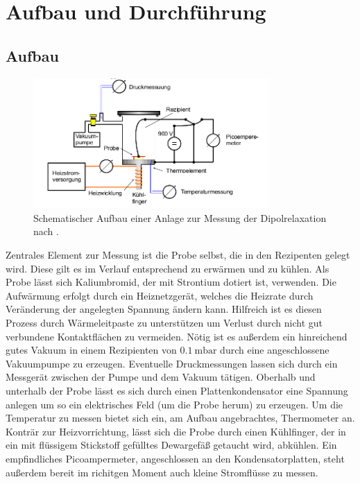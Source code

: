 \section{Aufbau und Durchführung}
\subsection{Aufbau}
\begin{figure}
    \centering
    \includegraphics[width=0.8\textwidth]{bilder/Aufbau.png}
    \caption{Schematischer Aufbau einer Anlage zur Messung der Dipolrelaxation nach
            \cite{skript}.}
    \label{fig:aufbau}
\end{figure}

Zentrales Element zur Messung ist die Probe selbst, die in den Rezipenten gelegt wird. Diese gilt es im Verlauf entsprechend
zu erwärmen und zu kühlen. Als Probe lässt sich Kaliumbromid, der mit Strontium
dotiert ist, verwenden. Die Aufwärmung erfolgt durch ein Heiznetzgerät, welches die Heizrate durch Veränderung der angelegten Spannung ändern kann.
Hilfreich ist es diesen Prozess durch Wärmeleitpaste zu unterstützen um
Verlust durch nicht gut verbundene Kontaktflächen zu vermeiden.
Nötig ist es außerdem ein hinreichend gutes Vakuum in einem Rezipienten von $\SI{0.1}{\milli\bar}$ 
durch eine angeschlossene Vakuumpumpe zu erzeugen.
Eventuelle Druckmessungen  lassen sich durch ein Messgerät zwischen der Pumpe und dem Vakuum tätigen.
Oberhalb und unterhalb der Probe lässt es sich durch einen Plattenkondensator eine Spannung anlegen um so ein 
elektrisches Feld (um die Probe herum) zu erzeugen. Um die Temperatur zu messen bietet sich ein, am Aufbau angebrachtes, Thermometer an.
Konträr zur Heizvorrichtung, lässt sich die Probe durch einen Kühlfinger, der in ein mit flüssigem Stickstoff gefülltes Dewargefäß getaucht wird, 
abkühlen.
Ein empfindliches Picoampermeter, angeschlossen an den Kondensatorplatten, steht außerdem bereit im richitgen Moment auch kleine
Stromflüsse zu messen.


